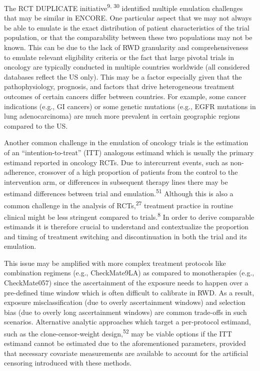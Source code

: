 \documentclass[
  letterpaper,
  DIV=11,
  numbers=noendperiod]{scrartcl}
\begin{document}
The RCT DUPLICATE initiative\textsuperscript{9, 30} identified multiple
emulation challenges that may be similar in ENCORE. One particular
aspect that we may not always be able to emulate is the exact
distribution of patient characteristics of the trial population, or that
the comparability between these two populations may not be known. This
can be due to the lack of RWD granularity and comprehensiveness to
emulate relevant eligibility criteria or the fact that large pivotal
trials in oncology are typically conducted in multiple countries
worldwide (all considered databases reflect the US only). This may be a
factor especially given that the pathophysiology, prognosis, and factors
that drive heterogeneous treatment outcomes of certain cancers differ
between countries. For example, some cancer indications (e.g., GI
cancers) or some genetic mutations (e.g., EGFR mutations in lung
adenocarcinoma) are much more prevalent in certain geographic regions
compared to the US.

Another common challenge in the emulation of oncology trials is the
estimation of an ``intention-to-treat'' (ITT) analogous estimand which
is usually the primary estimand reported in oncology RCTs. Due to
intercurrent events, such as non-adherence, crossover of a high
proportion of patients from the control to the intervention arm, or
differences in subsequent therapy lines there may be estimand
differences between trial and emulation.\textsuperscript{51} Although
this is also a common challenge in the analysis of
RCTs,\textsuperscript{27} treatment practice in routine clinical might
be less stringent compared to trials.\textsuperscript{8} In order to
derive comparable estimands it is therefore crucial to understand and
contextualize the proportion and timing of treatment switching and
discontinuation in both the trial and its emulation.

This issue may be amplified with more complex treatment protocols like
combination regimens (e.g., CheckMate9LA) as compared to monotherapies
(e.g., CheckMate057) since the ascertainment of the exposure needs to
happen over a pre-defined time window which is often difficult to
calibrate in RWD. As a result, exposure misclassification (due to overly
ascertainment windows) and selection bias (due to overly long
ascertainment windows) are common trade-offs in such scenarios.
Alternative analytic approaches which target a per-protocol estimand,
such as the clone-censor-weight design,\textsuperscript{52} may be
viable options if the ITT estimand cannot be estimated due to the
aforementioned parameters, provided that necessary covariate
measurements are available to account for the artificial censoring
introduced with these methods.
\end{document}
